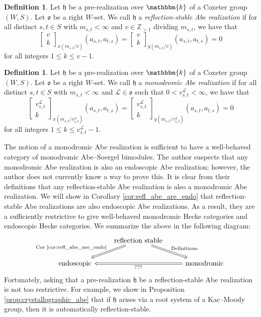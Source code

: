 \documentclass{amsart}
\newcommand{\Z}{\mathbb{Z}}
\renewcommand{\k}{\mathbbm{k}}
\newcommand{\scrL}{\mathcal{L}}
\newcommand{\fr}[1]{\mathfrak{#1}}
\renewcommand{\binom}[2]{\begin{bmatrix} #1 \\ #2 \end{bmatrix}}
\theoremstyle{definition}
\newtheorem{definition}[subsubsection]{Definition}
\numberwithin{equation}{subsection}
\begin{document}
\begin{definition}\label{def:reflection_abe_realization}
    Let $\fr{h}$ be a pre-realization over $\k$ of a Coxeter group $(W,S)$. Let $\fr{o}$ be a right $W$-set.
    We call $\fr{h}$ a \emph{reflection-stable Abe realization} if for all distinct $s,t \in S$ with $m_{s,t} < \infty$ and $v \in \Z_{> 1}$ dividing $m_{s,t}$, we have that
    \[\binom{v}{k}_{x(m_{s,t}/v)} (a_{s,t},a_{t,s}) = \binom{v}{k}_{y(m_{s,t}/v)} (a_{s,t}, a_{t,s}) = 0\]
    for all integers $1 \leq k \leq v - 1$.
\end{definition}

\begin{definition}\label{def:monodromic_abe_realization}
    Let $\fr{h}$ be a pre-realization over $\k$ of a Coxeter group $(W,S)$. Let $\fr{o}$ be a right $W$-set.
    We call $\fr{h}$ a \emph{monodromic Abe realization} if for all distinct $s,t \in S$ with $m_{s,t} < \infty$ and $\scrL \in \fr{o}$ such that $0 < v_{s,t}^{\scrL} < \infty$, we have that
    \[\binom{v_{s,t}^{\scrL}}{k}_{x(m_{s,t}/v_{s,t}^{\scrL})} (a_{s,t}, a_{t,s}) = \binom{v_{s,t}^{\scrL}}{k}_{y(m_{s,t}/v_{s,t}^{\scrL})} (a_{s,t}, a_{t,s}) = 0\]
    for all integers $1 \leq k \leq v_{s,t}^{\scrL} - 1$.
\end{definition}

The notion of a monodromic Abe realization is sufficient to have a well-behaved category of monodromic Abe--Soergel bimodules.
The author suspects that any monodromic Abe realization is also an endoscopic Abe realization; however, the author does not currently know a way to prove this.
It is clear from their definitions that any reflection-stable Abe realization is also a monodromic Abe realization.
We will show in Corollary \ref{cor:refl_abe_are_endo} that reflection-stable Abe realizations are also endoscopic Abe realizations.
As a result, they are a sufficiently restrictive to give well-behaved monodromic Hecke categories and endoscopic Hecke categories.
We summarize the above in the following diagram:
\[\begin{tikzcd}
                  & \text{reflection stable} \arrow[ld, "\text{Cor \ref{cor:refl_abe_are_endo}}"', Rightarrow] \arrow[rd, "\text{Definitions}", Rightarrow] &                                                 \\
\text{endoscopic} &                                                                                                           & \text{monodromic} \arrow[ll, "???", Rightarrow]
\end{tikzcd}\]
Fortunately, asking that a pre-realization $\fr{h}$ be a reflection-stable Abe realization is not too restrictive. 
For example, we show in Proposition \ref{prop:crystallographic_abe} that if $\fr{h}$ arises via a root system of a Kac--Moody group, then it is automatically reflection-stable. 
\end{document}
